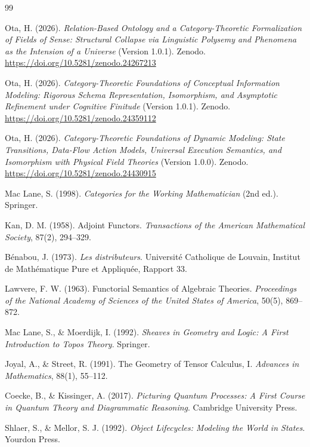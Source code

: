 \documentclass[11pt,a4paper]{article}
\theoremstyle{definition}
\theoremstyle{plain}
\theoremstyle{remark}
\begin{document}
\begin{thebibliography}{99}

Ota, H. (2026).
\emph{Relation-Based Ontology and a Category-Theoretic Formalization of Fields of Sense: Structural Collapse via Linguistic Polysemy and Phenomena as the Intension of a Universe} (Version 1.0.1).
Zenodo. \url{https://doi.org/10.5281/zenodo.24267213}

Ota, H. (2026).
\emph{Category-Theoretic Foundations of Conceptual Information Modeling: Rigorous Schema Representation, Isomorphism, and Asymptotic Refinement under Cognitive Finitude} (Version 1.0.1).
Zenodo. \url{https://doi.org/10.5281/zenodo.24359112}

Ota, H. (2026).
\emph{Category-Theoretic Foundations of Dynamic Modeling: State Transitions, Data-Flow Action Models, Universal Execution Semantics, and Isomorphism with Physical Field Theories} (Version 1.0.0).
Zenodo. \url{https://doi.org/10.5281/zenodo.24430915}

Mac Lane, S. (1998).
\emph{Categories for the Working Mathematician} (2nd ed.).
Springer.

Kan, D. M. (1958).
Adjoint Functors.
\emph{Transactions of the American Mathematical Society}, 87(2), 294--329.

B\'enabou, J. (1973).
\emph{Les distributeurs}.
Universit\'e Catholique de Louvain, Institut de Math\'ematique Pure et Appliqu\'ee, Rapport 33.

Lawvere, F. W. (1963).
Functorial Semantics of Algebraic Theories.
\emph{Proceedings of the National Academy of Sciences of the United States of America}, 50(5), 869--872.

Mac Lane, S., \& Moerdijk, I. (1992).
\emph{Sheaves in Geometry and Logic: A First Introduction to Topos Theory}.
Springer.

Joyal, A., \& Street, R. (1991).
The Geometry of Tensor Calculus, I.
\emph{Advances in Mathematics}, 88(1), 55--112.

Coecke, B., \& Kissinger, A. (2017).
\emph{Picturing Quantum Processes: A First Course in Quantum Theory and Diagrammatic Reasoning}.
Cambridge University Press.

Shlaer, S., \& Mellor, S. J. (1992).
\emph{Object Lifecycles: Modeling the World in States}.
Yourdon Press.


\end{thebibliography}
\end{document}
